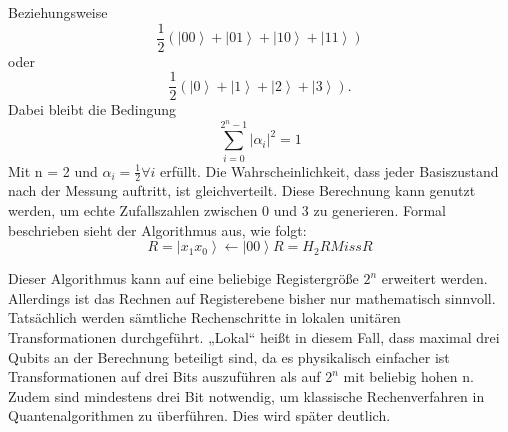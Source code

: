 Beziehungsweise $$\frac{1}{2}\left(\left|\left.00\right\rangle\right.+\left|\left.01\right\rangle\right.+\left|\left.10\right\rangle\right.+\left|\left.11\right\rangle\right.\right)$$ oder $$\frac{1}{2}\left(\left|\left.0\right\rangle\right.+\left|\left.1\right\rangle\right.+\left|\left.2\right\rangle\right.+\left|\left.3\right\rangle\right.\right).$$
Dabei bleibt die Bedingung 
$$\sum_{i=0}^{2^n-1}\left|\alpha_i\right|^2=1$$
 Mit n = 2 und $\alpha_i=\frac{1}{2}\forall i$ erfüllt. Die Wahrscheinlichkeit, dass jeder Basiszustand nach der Messung auftritt, ist gleichverteilt. Diese Berechnung kann genutzt werden, um echte Zufallszahlen zwischen 0 und 3 zu generieren. Formal beschrieben sieht der Algorithmus aus, wie folgt:
	$$R=\left|\left.x_1x_0\right\rangle\right.\gets\left|\left.00\right\rangle\right.
	R=H_2R
	Miss R$$

Dieser Algorithmus kann auf eine beliebige Registergröße $2^n$ erweitert werden. 
Allerdings ist das Rechnen auf Registerebene bisher nur mathematisch sinnvoll. Tatsächlich werden sämtliche Rechenschritte in lokalen unitären Transformationen durchgeführt. „Lokal“ heißt in diesem Fall, dass maximal drei Qubits an der Berechnung beteiligt sind, da es physikalisch einfacher ist Transformationen auf drei Bits auszuführen als auf $2^n$ mit beliebig hohen n. Zudem sind mindestens drei Bit notwendig, um klassische Rechenverfahren in Quantenalgorithmen zu überführen. Dies wird später deutlich.

